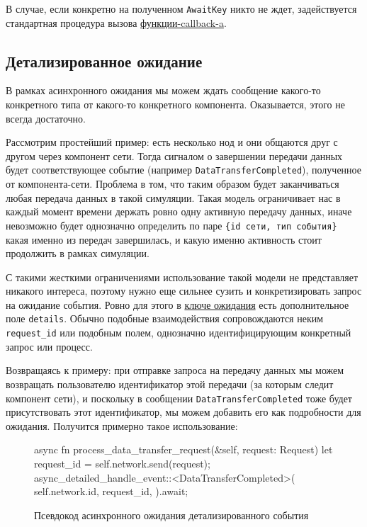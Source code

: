 В случае, если конкретно на полученном \texttt{AwaitKey} никто не ждет, задействуется стандартная процедура вызова \hyperref[fnon]{функции-callback-a}.

\subsection{Детализированное ожидание} \label{detailed-await}

В рамках асинхронного ожидания мы можем ждать сообщение какого-то конкретного типа от какого-то конкретного компонента. Оказывается, этого не всегда достаточно. 

Рассмотрим простейший пример: есть несколько нод и они общаются друг с другом через компонент сети. Тогда сигналом о завершении передачи данных будет соответствующее событие (например \texttt{DataTransferCompleted}), полученное от компонента-сети. Проблема в том, что таким образом будет заканчиваться любая передача данных в такой симуляции. Такая модель ограничивает нас в каждый момент времени держать ровно одну активную передачу данных, иначе невозможно будет однозначно определить по паре \texttt{\{id сети, тип события\}} какая именно из передач завершилась, и какую именно активность стоит продолжить в рамках симуляции. 

С такими жесткими ограничениями использование такой модели не представляет никакого интереса, поэтому нужно еще сильнее сузить и конкретизировать запрос на ожидание события. Ровно для этого в \hyperref[awaitkey]{ключе ожидания} есть дополнительное поле \texttt{details}. Обычно подобные взаимодействия сопровождаются неким \texttt{request\_id} или подобным полем, однозначно идентифицирующим конкретный запрос или процесс. 

Возвращаясь к примеру: при отправке запроса на передачу данных мы можем возвращать пользователю идентификатор этой передачи (за которым следит компонент сети), и поскольку в сообщении \texttt{DataTransferCompleted} тоже будет присутствовать этот идентификатор, мы можем добавить его как подробности для ожидания. Получится примерно такое использование: 
\begin{figure}[H]
    \small
\begin{rustcode}
async fn process_data_transfer_request(&self, request: Request) {
    let request_id = self.network.send(request);
    async_detailed_handle_event::<DataTransferCompleted>(
        self.network.id, 
        request_id,
    ).await;
}
\end{rustcode}
\caption{Псевдокод асинхронного ожидания детализированного события}
\label{async-detailed-pseudocode}
\end{figure}

